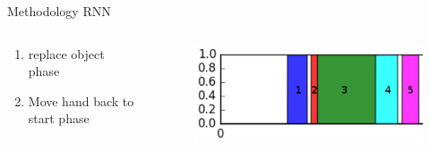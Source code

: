 \documentclass{beamer}
\begin{document}
\begin{frame}{Methodology RNN}
{\begin{columns}
\begin{column}{0.5\textwidth}
\begin{itemize}
\begin{enumerate}
                    \item replace object phase
                    \item Move hand back to start phase
                    \end{enumerate}
                \end{itemize}
                \end{column}
                \begin{column}{0.5\textwidth}

                    \begin{figure}[ht]
                    	\includegraphics[width=1.0\linewidth]{images/targets.png}
                    \end{figure}
                \end{column}
            \end{columns}



        }
\end{frame}
\end{document}

